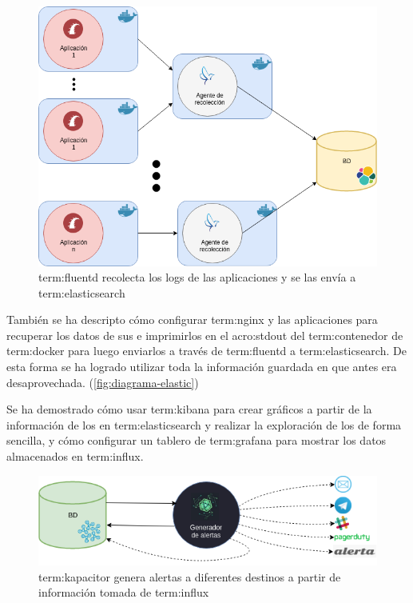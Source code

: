 \begin{figure}
  \includegraphics[width=\linewidth]{src/images/conclusiones/elastic.png}
  \caption{\gls{term:fluentd} recolecta los logs de las
    aplicaciones y se las envía a \gls{term:elasticsearch}}
  \label{fig:diagrama-elastic}
\end{figure}

También se ha descripto cómo configurar \gls{term:nginx} y las aplicaciones
para recuperar los datos de sus  e imprimirlos en el \gls{acro:stdout}
del \gls{term:contenedor} de \gls{term:docker} para luego enviarlos a
través de \gls{term:fluentd} a \gls{term:elasticsearch}. De esta forma se ha
logrado utilizar toda la información guardada en  que antes era
desaprovechada. (\autoref{fig:diagrama-elastic})

Se ha demostrado cómo usar \gls{term:kibana} para crear gráficos a partir de la
información de los  en \gls{term:elasticsearch} y realizar la exploración
de los  de forma sencilla, y cómo configurar un tablero de
\gls{term:grafana} para mostrar los datos almacenados en \gls{term:influx}.

\begin{figure}
  \includegraphics[width=\linewidth]{src/images/conclusiones/alerts.png}
  \caption{\gls{term:kapacitor} genera alertas a diferentes destinos a partir
    de información tomada de \gls{term:influx}}
  \label{fig:diagrama-alerts}
\end{figure}

